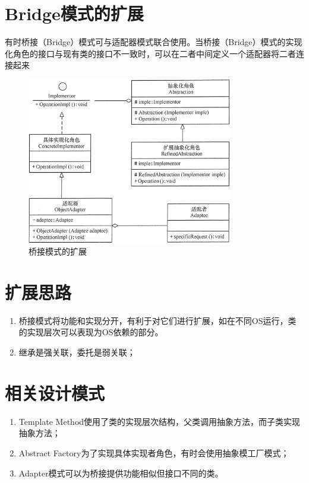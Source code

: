 \section{Bridge模式的扩展}
有时桥接（Bridge）模式可与适配器模式联合使用。当桥接（Bridge）模式的实现化角色的接口与现有类的接口不一致时，可以在二者中间定义一个适配器将二者连接起来
\begin{figure}
	\centering
	\includegraphics[width=0.8\textwidth]{image/9-2}
	\caption{桥接模式的扩展}
\end{figure}
\section{扩展思路}
\begin{enumerate}
	\item 桥接模式将功能和实现分开，有利于对它们进行扩展，如在不同OS运行，类的实现层次可以表现为OS依赖的部分。
	\item 继承是强关联，委托是弱关联；
\end{enumerate}
\section{相关设计模式}
\begin{enumerate}
	\item Template Method使用了类的实现层次结构，父类调用抽象方法，而子类实现抽象方法；
	\item Abstract Factory为了实现具体实现者角色，有时会使用抽象模工厂模式；
	\item Adapter模式可以为桥接提供功能相似但接口不同的类。
\end{enumerate}